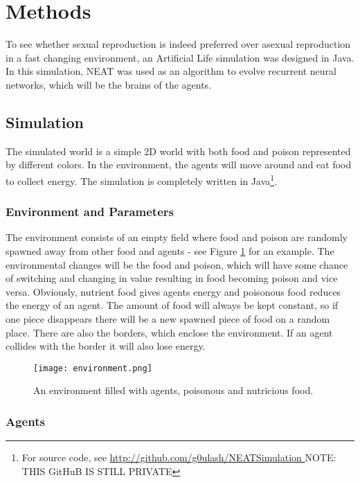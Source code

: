 \section{Methods}

To see whether sexual reproduction is indeed preferred over asexual reproduction in a fast changing environment, an Artificial Life simulation was designed in Java. In this simulation, NEAT was used as an algorithm to evolve recurrent neural networks, which will be the brains of the agents.

\subsection{Simulation}

The simulated world is a simple 2D world with both food and poison represented by different colors.
In the environment, the agents will move around and eat food to collect energy.
The simulation is completely written in Java\footnote{For source code, see \url{http://github.com/g0ulash/NEATSimulation } NOTE: THIS GitHuB IS STILL PRIVATE}.

\subsubsection{Environment and Parameters}

The environment consists of an empty field where food and poison are randomly spawned away from other food and agents - see Figure \ref{fig:env} for an example.
The environmental changes will be the food and poison, which will have some chance of switching and changing in value resulting in food becoming poison and vice versa. 
Obviously, nutrient food gives agents energy and poisonous food reduces the energy of an agent.
The amount of food will always be kept constant, so if one piece disappears there will be a new spawned piece of food on a random place.
There are also the borders, which enclose the environment.
If an agent collides with the border it will also lose energy.

\begin{figure}[H]
\centering
\texttt{[image: environment.png]}
\caption{An environment filled with agents, poisonous and nutricious food.}
\label{fig:env}
\end{figure}

\subsubsection{Agents}

